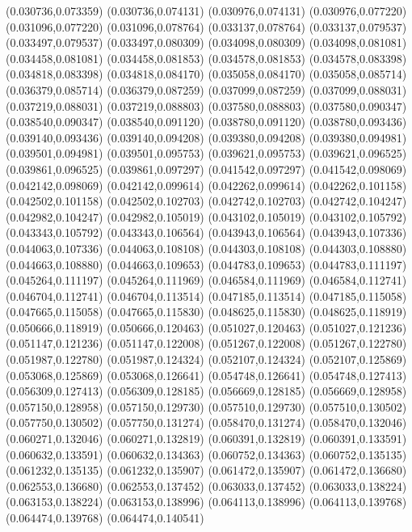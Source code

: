 (0.030736,0.073359)
(0.030736,0.074131)
(0.030976,0.074131)
(0.030976,0.077220)
(0.031096,0.077220)
(0.031096,0.078764)
(0.033137,0.078764)
(0.033137,0.079537)
(0.033497,0.079537)
(0.033497,0.080309)
(0.034098,0.080309)
(0.034098,0.081081)
(0.034458,0.081081)
(0.034458,0.081853)
(0.034578,0.081853)
(0.034578,0.083398)
(0.034818,0.083398)
(0.034818,0.084170)
(0.035058,0.084170)
(0.035058,0.085714)
(0.036379,0.085714)
(0.036379,0.087259)
(0.037099,0.087259)
(0.037099,0.088031)
(0.037219,0.088031)
(0.037219,0.088803)
(0.037580,0.088803)
(0.037580,0.090347)
(0.038540,0.090347)
(0.038540,0.091120)
(0.038780,0.091120)
(0.038780,0.093436)
(0.039140,0.093436)
(0.039140,0.094208)
(0.039380,0.094208)
(0.039380,0.094981)
(0.039501,0.094981)
(0.039501,0.095753)
(0.039621,0.095753)
(0.039621,0.096525)
(0.039861,0.096525)
(0.039861,0.097297)
(0.041542,0.097297)
(0.041542,0.098069)
(0.042142,0.098069)
(0.042142,0.099614)
(0.042262,0.099614)
(0.042262,0.101158)
(0.042502,0.101158)
(0.042502,0.102703)
(0.042742,0.102703)
(0.042742,0.104247)
(0.042982,0.104247)
(0.042982,0.105019)
(0.043102,0.105019)
(0.043102,0.105792)
(0.043343,0.105792)
(0.043343,0.106564)
(0.043943,0.106564)
(0.043943,0.107336)
(0.044063,0.107336)
(0.044063,0.108108)
(0.044303,0.108108)
(0.044303,0.108880)
(0.044663,0.108880)
(0.044663,0.109653)
(0.044783,0.109653)
(0.044783,0.111197)
(0.045264,0.111197)
(0.045264,0.111969)
(0.046584,0.111969)
(0.046584,0.112741)
(0.046704,0.112741)
(0.046704,0.113514)
(0.047185,0.113514)
(0.047185,0.115058)
(0.047665,0.115058)
(0.047665,0.115830)
(0.048625,0.115830)
(0.048625,0.118919)
(0.050666,0.118919)
(0.050666,0.120463)
(0.051027,0.120463)
(0.051027,0.121236)
(0.051147,0.121236)
(0.051147,0.122008)
(0.051267,0.122008)
(0.051267,0.122780)
(0.051987,0.122780)
(0.051987,0.124324)
(0.052107,0.124324)
(0.052107,0.125869)
(0.053068,0.125869)
(0.053068,0.126641)
(0.054748,0.126641)
(0.054748,0.127413)
(0.056309,0.127413)
(0.056309,0.128185)
(0.056669,0.128185)
(0.056669,0.128958)
(0.057150,0.128958)
(0.057150,0.129730)
(0.057510,0.129730)
(0.057510,0.130502)
(0.057750,0.130502)
(0.057750,0.131274)
(0.058470,0.131274)
(0.058470,0.132046)
(0.060271,0.132046)
(0.060271,0.132819)
(0.060391,0.132819)
(0.060391,0.133591)
(0.060632,0.133591)
(0.060632,0.134363)
(0.060752,0.134363)
(0.060752,0.135135)
(0.061232,0.135135)
(0.061232,0.135907)
(0.061472,0.135907)
(0.061472,0.136680)
(0.062553,0.136680)
(0.062553,0.137452)
(0.063033,0.137452)
(0.063033,0.138224)
(0.063153,0.138224)
(0.063153,0.138996)
(0.064113,0.138996)
(0.064113,0.139768)
(0.064474,0.139768)
(0.064474,0.140541)
